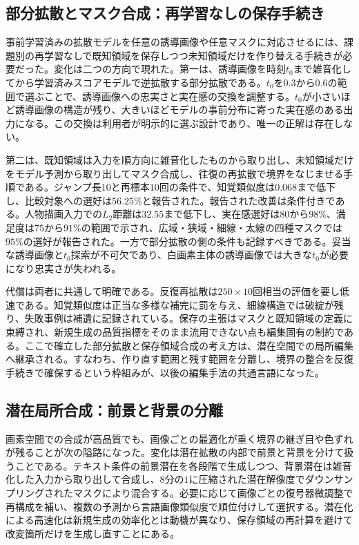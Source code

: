\documentclass[lualatex,a4paper,10pt]{jlreq}
\begin{document}
\subsection{部分拡散とマスク合成：再学習なしの保存手続き}
事前学習済みの拡散モデルを任意の誘導画像や任意マスクに対応させるには、課題別の再学習なしで既知領域を保存しつつ未知領域だけを作り替える手続きが必要だった\autocite{btd044,btd045}。変化は二つの方向で現れた。第一は、誘導画像を時刻$t_0$まで雑音化してから学習済みスコアモデルで逆拡散する部分拡散である。$t_0$を$0.3$から$0.6$の範囲で選ぶことで、誘導画像への忠実さと実在感の交換を調整する\autocite{btd044}。$t_0$が小さいほど誘導画像の構造が残り、大きいほどモデルの事前分布に寄った実在感のある出力になる。この交換は利用者が明示的に選ぶ設計であり、唯一の正解は存在しない。

第二は、既知領域は入力を順方向に雑音化したものから取り出し、未知領域だけをモデル予測から取り出してマスク合成し、往復の再拡散で境界をなじませる手順である\autocite{btd045}。ジャンプ長$10$と再標本$10$回の条件で、知覚類似度は$0.068$まで低下し、比較対象への選好は$56.25\%$と報告された\autocite{btd045}。報告された改善は条件付きである。人物描画入力での$L_2$距離は$32.55$まで低下し、実在感選好は$80$から$98\%$、満足度は$75$から$91\%$の範囲で示され、広域・狭域・細線・太線の四種マスクでは$95\%$の選好が報告された\autocite{btd045}。一方で部分拡散の側の条件も記録すべきである。妥当な誘導画像と$t_0$探索が不可欠であり、白画素主体の誘導画像では大きな$t_0$が必要になり忠実さが失われる\autocite{btd044}。

代償は両者に共通して明確である。反復再拡散は$250 \times 10$回相当の評価を要し低速である\autocite{btd045}。知覚類似度は正当な多様な補完に罰を与え、細線構造では破綻が残り、失敗事例は補遺に記録されている\autocite{btd045}。保存の主張はマスクと既知領域の定義に束縛され、新規生成の品質指標をそのまま流用できない点も編集固有の制約である\autocite{btd044,btd045}。ここで確立した部分拡散と保存領域合成の考え方は、潜在空間での局所編集へ継承される。すなわち、作り直す範囲と残す範囲を分離し、境界の整合を反復手続きで確保するという枠組みが、以後の編集手法の共通言語になった\autocite{btd044,btd045,btd046}。

\subsection{潜在局所合成：前景と背景の分離}
画素空間での合成が高品質でも、画像ごとの最適化が重く境界の継ぎ目や色ずれが残ることが次の隘路になった\autocite{btd046}。変化は潜在拡散の内部で前景と背景を分けて扱うことである。テキスト条件の前景潜在を各段階で生成しつつ、背景潜在は雑音化した入力から取り出して合成し、$8$分の$1$に圧縮された潜在解像度でダウンサンプリングされたマスクにより混合する\autocite{btd046}。必要に応じて画像ごとの復号器微調整で再構成を補い、複数の予測から言語画像類似度で順位付けして選択する。潜在化による高速化は新規生成の効率化とは動機が異なり、保存領域の再計算を避けて改変箇所だけを生成し直すことにある\autocite{btd046}。
\end{document}
